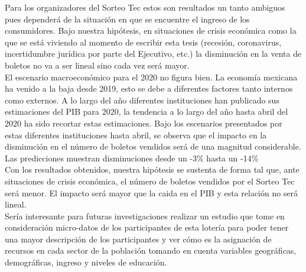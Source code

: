 Para los organizadores del Sorteo Tec estos son resultados un tanto ambiguos pues dependerá de la situación en que se encuentre el ingreso de los consumidores. Bajo nuestra hipótesis, en situaciones de crisis económica como la que se está viviendo al momento de escribir esta tesis (recesión, coronavirus, incertidumbre jurídica por parte del Ejecutivo, etc.) la disminución en la venta de boletos no va a ser lineal sino cada vez será mayor. \\

El escenario macroeconómico para el 2020 no figura bien. La economía mexicana ha venido a la baja desde 2019, esto se debe a diferentes factores tanto internos como externos. A lo largo del año diferentes instituciones han publicado sus estimaciones del PIB para 2020, la tendencia a lo largo del año hasta abril del 2020 ha sido recortar estas estimaciones. Bajo los escenarios presentados por estas diferentes instituciones hasta abril, se observa que el impacto en la disminución en el número de boletos vendidos será de una magnitud considerable. Las predicciones muestran disminuciones desde un -3\% hasta un -14\% \\

Con los resultados obtenidos, nuestra hipótesis se sustenta de forma tal que, ante situaciones de crisis económica, el número de boletos vendidos por el Sorteo Tec será menor. El impacto será mayor que la caida en el PIB y esta relación no será lineal. \\




Sería interesante para futuras investigaciones realizar un estudio que tome en consideración micro-datos de los participantes de esta lotería para poder tener una mayor descripción de los participantes y ver cómo es la asignación de recursos en cada sector de la población tomando en cuenta variables geográficas, demográficas, ingreso y niveles de educación.

